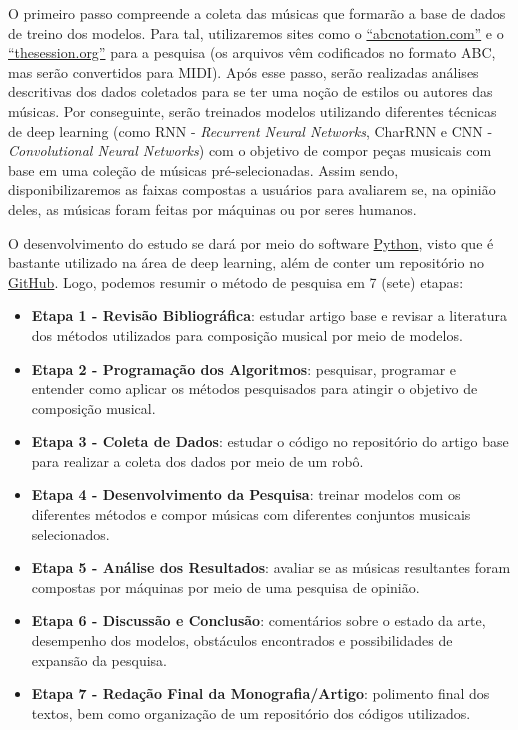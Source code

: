 \documentclass{automatextcc}
\begin{document}
O primeiro passo compreende a coleta das músicas que formarão a base de dados de treino dos modelos. Para tal, utilizaremos sites como o \href{https://abcnotation.com/}{``abcnotation.com''} e o  \href{https://thesession.org/}{``thesession.org''} para a pesquisa (os arquivos vêm codificados no formato ABC, mas serão convertidos para MIDI). Após esse passo, serão realizadas análises descritivas dos dados coletados para se ter uma noção de estilos ou autores das músicas. Por conseguinte, serão treinados modelos utilizando diferentes técnicas de deep learning (como RNN - \textit{Recurrent Neural Networks}, CharRNN e CNN - \textit{Convolutional Neural Networks}) com o objetivo de compor peças musicais com base em uma coleção de músicas pré-selecionadas. Assim sendo, disponibilizaremos as faixas compostas a usuários para avaliarem se, na opinião deles, as músicas foram feitas por máquinas ou por seres humanos.

O desenvolvimento do estudo se dará por meio do software \href{https://www.python.org}{Python}, visto que é bastante utilizado na área de deep learning, além de \cite{agarwala2017music} conter um repositório no \href{https://github.com/yinoue93/CS224N_proj}{GitHub}. Logo, podemos resumir o método de pesquisa em 7 (sete) etapas:

\begin{itemize}
    \item \textbf{Etapa 1 - Revisão Bibliográfica}: estudar artigo base e revisar a literatura dos métodos utilizados para composição musical por meio de modelos.
    \item \textbf{Etapa 2 - Programação dos Algoritmos}: pesquisar, programar e entender como aplicar os métodos pesquisados para atingir o objetivo de composição musical.
    \item \textbf{Etapa 3 - Coleta de Dados}: estudar o código no repositório do artigo base para realizar a coleta dos dados por meio de um robô.
    \item \textbf{Etapa 4 - Desenvolvimento da Pesquisa}: treinar modelos com os diferentes métodos e compor músicas com diferentes conjuntos musicais selecionados.
    \item \textbf{Etapa 5 - Análise dos Resultados}: avaliar se as músicas resultantes foram compostas por máquinas por meio de uma pesquisa de opinião.
    \item \textbf{Etapa 6 - Discussão e Conclusão}: comentários sobre o estado da arte, desempenho dos modelos, obstáculos encontrados e possibilidades de expansão da pesquisa.
    \item \textbf{Etapa 7 - Redação Final da Monografia/Artigo}: polimento final dos textos, bem como organização de um repositório dos códigos utilizados.

\end{itemize}
\end{document}

